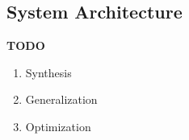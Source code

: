 \subsection{System Architecture}

\textbf{TODO}

\begin{enumerate}
    \item Synthesis
    \item Generalization
    \item Optimization
\end{enumerate}